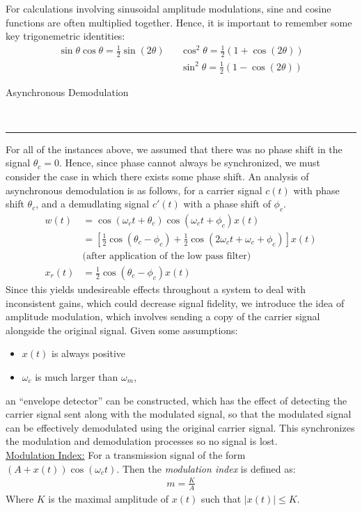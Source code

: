 \documentclass{article}
\newcommand{\sheader}[1]{\underline{#1:}}
\newcommand{\header}[1]{\begin{large}\noindent #1\end{large}\\\rule{\textwidth}{0.5pt}}
\newcommand{\gap}{\medskip\\}
\begin{document}
For calculations involving sinusoidal amplitude modulations, sine and cosine functions are
often multiplied together. Hence, it is important to remember some key trigonemetric identities:
\begin{align*}
    \sin\theta\cos\theta = \frac{1}{2}\sin(2 \theta) && \cos^2\theta = \frac{1}{2}\left( 1 + \cos(2 \theta)\right)\\
    && \sin^2\theta = \frac{1}{2}\left(1 - \cos(2\theta)\right) 
\end{align*}

\header{Asynchronous Demodulation}
For all of the instances above, we assumed that there was no phase shift in the signal $\theta_c = 0$.
Hence, since phase cannot always be synchronized, we must consider the case in which 
there exists some phase shift. An analysis of asynchronous demodulation is as follows,
for a carrier signal $c(t)$ with phase shift $\theta_c$, and a demudlating signal $c'(t)$
with a phase shift of $\phi_c$.
\begin{align*}
    w(t) &= \cos(\omega_c t + \theta_c)\cos(\omega_c t + \phi_c)x(t)\\
    &= \left[\frac{1}{2} \cos (\theta_c - \phi_c) + \frac{1}{2} \cos \left(2 \omega_c t + \omega_c + \phi_c\right)\right] x(t)\\
    &\textrm{(after application of the low pass filter)}\\
    x_r(t) &= \frac{1}{2}\cos(\theta_c - \phi_c)x(t)
\end{align*}
Since this yields undesireable effects throughout a system to deal with inconsistent gains,
which could decrease signal fidelity, we introduce the idea of amplitude modulation, which 
involves sending a copy of the carrier signal alongside the original signal. Given some assumptions:
\begin{itemize}
    \item $x(t)$ is always positive
    \item $\omega_c$ is much larger than $\omega_m$,
\end{itemize}
an ``envelope detector'' can be constructed, which has the effect of detecting the carrier 
signal sent along with the modulated signal, so that the modulated signal can be 
effectively demodulated using the original carrier signal. This synchronizes the 
modulation and demodulation processes so no signal is lost.
\gap
\sheader{Modulation Index} For a transmission signal of the form $(A + x(t))\cos(\omega_c t)$.
Then the \textit{modulation index} is defined as:
\begin{align*}
    m = \frac{K}{A}
\end{align*}
Where $K$ is the maximal amplitude of $x(t)$ such that $|x(t)| \leq K$. 
\end{document}
